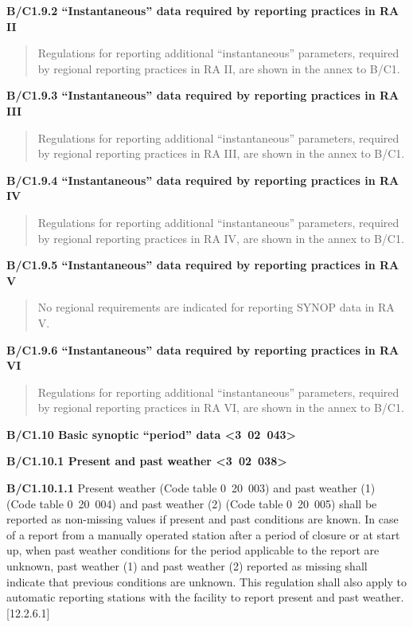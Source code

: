 \textbf{B/C1.9.2 ``Instantaneous'' data required by reporting practices in RA II}

\begin{quote}
Regulations for reporting additional ``instantaneous'' parameters, required by regional reporting practices in RA II, are shown in the annex to B/C1.
\end{quote}

\textbf{B/C1.9.3 ``Instantaneous'' data required by reporting practices in RA III}

\begin{quote}
Regulations for reporting additional ``instantaneous'' parameters, required by regional reporting practices in RA III, are shown in the annex to B/C1.
\end{quote}

\textbf{B/C1.9.4 ``Instantaneous'' data required by reporting practices in RA IV}

\begin{quote}
Regulations for reporting additional ``instantaneous'' parameters, required by regional reporting practices in RA IV, are shown in the annex to B/C1.
\end{quote}

\textbf{B/C1.9.5 ``Instantaneous'' data required by reporting practices in RA V}

\begin{quote}
No regional requirements are indicated for reporting SYNOP data in RA V.
\end{quote}

\textbf{B/C1.9.6 ``Instantaneous'' data required by reporting practices in RA VI}

\begin{quote}
Regulations for reporting additional ``instantaneous'' parameters, required by regional reporting practices in RA VI, are shown in the annex to B/C1.
\end{quote}

\textbf{B/C1.10 Basic synoptic ``period'' data \textless3~02~043\textgreater{}}

\textbf{B/C1.10.1 Present and past weather \textless3~02~038\textgreater{}}

\textbf{B/C1.10.1.1} Present weather (Code table 0~20~003) and past weather (1) (Code table 0~20~004) and past weather (2) (Code table 0~20~005) shall be reported as non-missing values if present and past conditions are known. In case of a report from a manually operated station after a period of closure or at start up, when past weather conditions for the period applicable to the report are unknown, past weather (1) and past weather (2) reported as missing shall indicate that previous conditions are unknown. This regulation shall also apply to automatic reporting stations with the facility to report present and past weather. {[}12.2.6.1{]}

